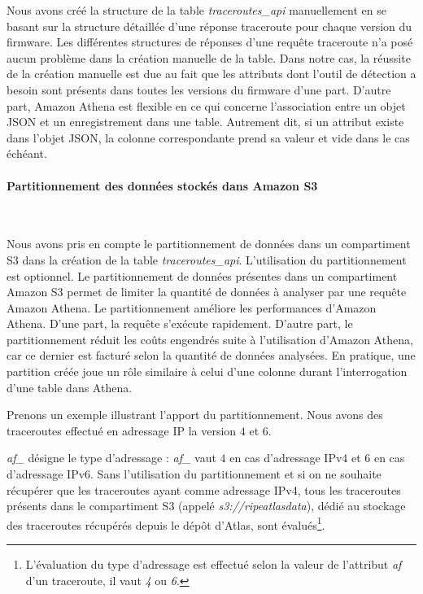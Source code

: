 Nous avons créé la structure de la table \textit{traceroutes\_api}  manuellement en se basant sur la structure détaillée d'une réponse traceroute pour chaque version du firmware. Les différentes structures de réponses d'une requête traceroute n'a posé aucun problème dans la création manuelle de la table. Dans notre cas, la réussite de la création manuelle est due au fait que les attributs dont l'outil de détection a besoin sont présents dans toutes les versions du firmware d'une part. D'autre part, Amazon Athena est flexible en ce qui concerne l'association entre un objet JSON et un enregistrement dans une table. Autrement dit, si un attribut existe dans l'objet JSON, la colonne correspondante prend sa valeur et vide dans le cas échéant.  

\paragraph{Partitionnement des données stockés dans Amazon S3}~

Nous avons   pris en compte  le partitionnement de données dans un compartiment S3 dans la création de la table \textit{traceroutes\_api}.  L'utilisation du partitionnement est optionnel. 
Le partitionnement  de données présentes dans un compartiment Amazon S3 permet de limiter la quantité de données à analyser par une requête Amazon Athena. Le partitionnement améliore  les performances d'Amazon Athena. D'une part, la requête s'exécute rapidement. D'autre part, le partitionnement réduit les coûts engendrés  suite à l'utilisation d'Amazon Athena, car ce dernier est facturé selon la quantité de données analysées. En pratique,  une partition créée joue un rôle similaire à celui d'une colonne durant l'interrogation d'une table dans Athena. 

Prenons un exemple illustrant l'apport du partitionnement. Nous avons des traceroutes effectué en adressage IP la version  $ 4 $ et $ 6 $.


\textit{af\_} désigne le type d'adressage : \textit{af\_} vaut $4$ en cas d'adressage IPv4 et $6$ en cas d'adressage IPv6. Sans l'utilisation du partitionnement et si on ne souhaite récupérer que  les traceroutes ayant comme adressage IPv4, tous les traceroutes présents dans le compartiment S3 (appelé \textit{s3://ripeatlasdata}), dédié au stockage des traceroutes récupérés depuis le dépôt d'Atlas, sont évalués\footnote{L'évaluation du type  d'adressage est effectué selon la valeur de l'attribut \textit{af} d'un traceroute, il vaut \textit{4} ou \textit{6}.}.

